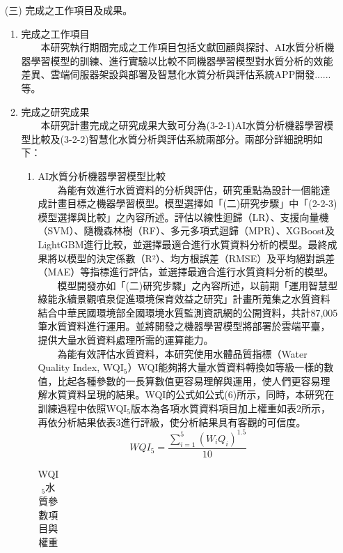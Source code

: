 \documentclass[12pt,a4paper]{article}
\begin{document}
\begin{enumerate}
\item[(三)] 完成之工作項目及成果。
\begin{enumerate}[label=\arabic*.]
\item 完成之工作項目\\
　　本研究執行期間完成之工作項目包括文獻回顧與探討、AI水質分析機器學習模型的訓練、進行實驗以比較不同機器學習模型對水質分析的效能差異、雲端伺服器架設與部署及智慧化水質分析與評估系統APP開發......等。
\item 完成之研究成果\\
　　本研究計畫完成之研究成果大致可分為(3-2-1)AI水質分析機器學習模型比較及(3-2-2)智慧化水質分析與評估系統兩部分。兩部分詳細說明如下：
    \begin{enumerate}[label=3-2-\arabic*.]
        \item AI水質分析機器學習模型比較\\
        　　為能有效進行水質資料的分析與評估，研究重點為設計一個能達成計畫目標之機器學習模型。模型選擇如「(二)研究步驟」中「(2-2-3)模型選擇與比較」之內容所述。評估以線性迴歸（LR）、支援向量機（SVM）、隨機森林樹（RF）、多元多項式迴歸（MPR）、XGBoost及LightGBM進行比較，並選擇最適合進行水質資料分析的模型。最終成果將以模型的決定係數（R²）、均方根誤差（RMSE）及平均絕對誤差（MAE）等指標進行評估，並選擇最適合進行水質資料分析的模型。\\
        　　模型開發亦如「(二)研究步驟」之內容所述，以前期「運用智慧型綠能永續景觀噴泉促進環境保育效益之研究」計畫所蒐集之水質資料結合中華民國環境部全國環境水質監測資訊網的公開資料，共計87,005筆水質資料進行運用。並將開發之機器學習模型將部署於雲端平臺，提供大量水質資料處理所需的運算能力。\\
        　　為能有效評估水質資料，本研究使用水體品質指標（Water Quality Index, WQI$_5$）WQI能夠將大量水質資料轉換如等級一樣的數值，比起各種參數的一長算數值更容易理解與運用，使人們更容易理解水質資料呈現的結果\cite{ref35}。WQI的公式如公式(6)所示，同時，本研究在訓練過程中依照WQI$_5$版本為各項水質資料項目加上權重如表2所示，再依分析結果依表3進行評級，使分析結果具有客觀的可信度。\\
        \begin{equation}
            WQI_5 = \frac{\sum_{i=1}^5 (W_i Q_i)^{1.5}}{10}
        \end{equation}
            \begin{table}[H]
                \centering
                    \begin{minipage}[t]{0.45\textwidth}
                        \centering
                        \caption{WQI$_5$水質參數項目與權重}
                            \begin{tabular}{cc}

\end{tabular}
\end{minipage}
\end{table}
\end{enumerate}
\end{enumerate}
\end{enumerate}
\end{document}
